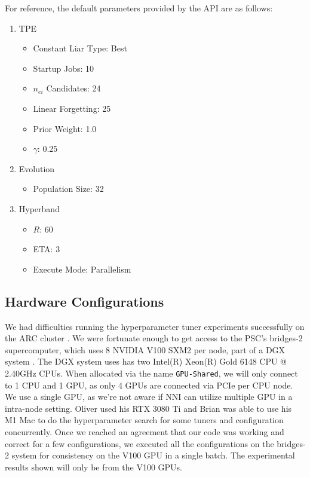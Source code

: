 \documentclass{article}
\begin{document}
For reference, the default parameters provided by the API are as follows:
\begin{enumerate}
	\item TPE
	      \begin{itemize}
		      \item Constant Liar Type: Best
		      \item Startup Jobs: 10
		      \item $n_{ei}$ Candidates: 24
		      \item Linear Forgetting: 25
		      \item Prior Weight: 1.0
		      \item $\gamma$: 0.25
	      \end{itemize}
	\item Evolution
	      \begin{itemize}
		      \item Population Size: 32
	      \end{itemize}
	\item Hyperband
	      \begin{itemize}
		      \item $R$: 60
		      \item ETA: 3
		      \item Execute Mode: Parallelism
	      \end{itemize}
\end{enumerate}

\subsection{Hardware Configurations}
We had difficulties running the hyperparameter tuner experiments successfully on the ARC cluster \cite{arc}. We were fortunate enough to get access to the PSC's bridges-2 supercomputer, which uses 8 NVIDIA V100 SXM2 per node, part of a DGX system \cite{v100, bridges-2}. The DGX system uses has two Intel(R) Xeon(R) Gold 6148 CPU @ 2.40GHz CPUs. When allocated via the name \verb|GPU-Shared|, we will only connect to 1 CPU and 1 GPU, as only 4 GPUs are connected via PCIe per CPU node. We use a single GPU, as we're not aware if NNI can utilize multiple GPU in a intra-node setting. Oliver used his RTX 3080 Ti and Brian was able to use his M1 Mac to do the hyperparameter search for some tuners and configuration concurrently. Once we reached an agreement that our code was working and correct for a few configurations, we executed all the configurations on the bridges-2 system for consistency on the V100 GPU in a single batch. The experimental results shown will only be from the V100 GPUs.
\end{document}

